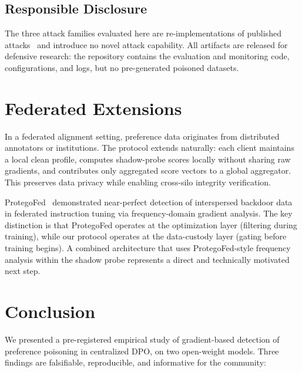 \documentclass[runningheads]{llncs}
\begin{document}
\subsection{Responsible Disclosure}\label{sec:disclosure}

The three attack families evaluated here are re-implementations of published
attacks~\cite{pathmanathan2024poisoning,rando2023jailbreak,baumgartner2024bestofvenom}
and introduce no novel attack capability. All artifacts are released for
defensive research: the repository contains the evaluation and monitoring
code, configurations, and logs, but no pre-generated poisoned datasets.

\section{Federated Extensions}\label{sec:extensions}

In a federated alignment setting, preference data originates from distributed
annotators or institutions. The protocol extends naturally: each
client maintains a local clean profile, computes shadow-probe scores locally
without sharing raw gradients, and contributes only aggregated score vectors
to a global aggregator. This preserves data privacy while enabling cross-silo
integrity verification.

ProtegoFed~\cite{protegofed2026} demonstrated near-perfect detection of
interspersed backdoor data in federated instruction tuning via frequency-domain
gradient analysis. The key distinction is that ProtegoFed operates at the
optimization layer (filtering during training), while our protocol operates at
the data-custody layer (gating before training begins). A combined architecture
that uses ProtegoFed-style frequency analysis within the shadow probe
represents a direct and technically motivated next step.

\section{Conclusion}\label{sec:conclusion}

We presented a pre-registered empirical study of gradient-based detection of
preference poisoning in centralized DPO, on two open-weight models. Three
findings are falsifiable, reproducible, and informative for the community:
\end{document}
